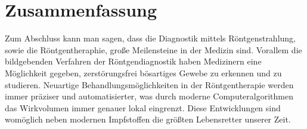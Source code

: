 \section{Zusammenfassung}
Zum Abschluss kann man sagen, dass die Diagnostik mittels Röntgenstrahlung, sowie die Röntgentheraphie, große Meilensteine in der Medizin sind.
Vorallem die bildgebenden Verfahren der Röntgendiagnostik haben Medizinern eine Möglichkeit gegeben, zerstörungsfrei bösartiges Gewebe zu erkennen und zu studieren.
Neuartige Behandlungsmöglichkeiten in der Röntgentherapie werden immer präziser und automatisierter, was durch moderne Computeralgorithmen das Wirkvolumen immer genauer lokal eingrenzt.
Diese Entwicklungen sind womöglich neben modernen Impfstoffen die größten Lebensretter unserer Zeit. 